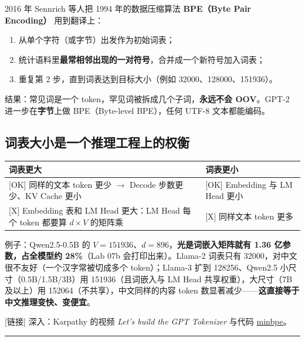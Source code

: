 2016 年 Sennrich 等人把 1994 年的数据压缩算法 \textbf{BPE（Byte Pair Encoding）} 用到翻译上：
\begin{enumerate}
  \item 从单个字符（或字节）出发作为初始词表；
  \item 统计语料里\textbf{最常相邻出现的一对符号}，合并成一个新符号加入词表；
  \item 重复第 2 步，直到词表达到目标大小（例如 32000、128000、151936）。
\end{enumerate}

结果：常见词是一个 token，罕见词被拆成几个子词，\textbf{永远不会 OOV}。GPT-2 进一步在\textbf{字节}上做 BPE（Byte-level BPE），任何 UTF-8 文本都能编码。

\subsection{词表大小是一个推理工程上的权衡}

\begin{center}
\small
\begin{tabularx}{\textwidth}{p{3.5cm} X}
\toprule
\textbf{词表更大} & \textbf{词表更小} \\
\midrule
{}[OK] 同样的文本 token 更少 $\rightarrow$ Decode 步数更少、KV Cache 更小 & {}[OK] Embedding 与 LM Head 更小 \\
{}[X] Embedding 表和 LM Head 更大：LM Head 每个 token 都要算 $d \times V$ 的矩阵乘 & {}[X] 同样文本 token 更多 \\
\bottomrule
\end{tabularx}
\end{center}

例子：Qwen2.5-0.5B 的 $V = 151936$、$d = 896$，\textbf{光是词嵌入矩阵就有 1.36 亿参数，占全模型约 28\%}（Lab 07b 会打印出来）。Llama-2 词表只有 32000，对中文很不友好（一个汉字常被切成多个 token）；Llama-3 扩到 128256、Qwen2.5 小尺寸（0.5B/1.5B/3B）用 151936（且词嵌入与 LM Head 共享权重），大尺寸（7B 及以上）用 152064（不共享），中文同样的内容 token 数显著减少——\textbf{这直接等于中文推理变快、变便宜}。

\begin{noteBox}[核心导读与背景]
{}[链接] 深入：Karpathy 的视频 \textit{Let's build the GPT Tokenizer} 与代码 \href{https://github.com/karpathy/minbpe}{minbpe}。
\end{noteBox}

\vspace{0.8em}\hrule\vspace{0.8em}

